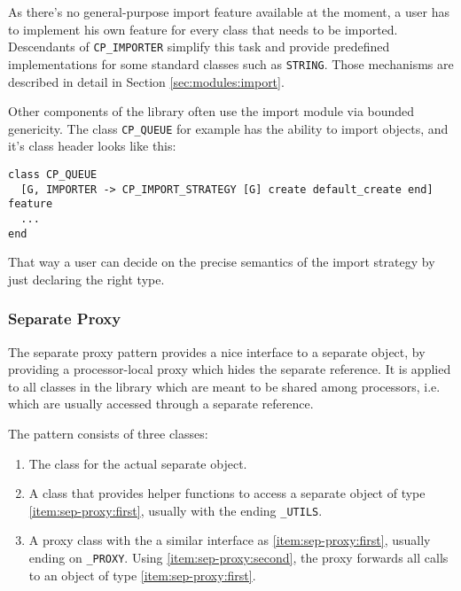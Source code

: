 \documentclass[a4paper,10pt]{article}
\begin{document}
As there's no general-purpose import feature available at the moment, a user has to implement his own feature for every class that needs to be imported.
Descendants of \lstinline!CP_IMPORTER! simplify this task and provide predefined implementations for some standard classes such as \lstinline!STRING!.
Those mechanisms are described in detail in Section \ref{sec:modules:import}.

Other components of the library often use the import module via bounded genericity.
The class \lstinline!CP_QUEUE! for example has the ability to import objects, and it's class header looks like this:
\begin{lstlisting}
class CP_QUEUE
  [G, IMPORTER -> CP_IMPORT_STRATEGY [G] create default_create end]
feature
  ...
end
\end{lstlisting}
That way a user can decide on the precise semantics of the import strategy by just declaring the right type.



\subsubsection{Separate Proxy}

The separate proxy pattern provides a nice interface to a separate object, by providing a processor-local proxy which hides the separate reference.
It is applied to all classes in the library which are meant to be shared among processors, i.e. which are usually accessed through a separate reference.

The pattern consists of three classes:
\begin{enumerate} [label=(\arabic*)]
 \item\label{item:sep-proxy:first} The class for the actual separate object.
 \item\label{item:sep-proxy:second} A class that provides helper functions to access a separate object of type \ref{item:sep-proxy:first}, usually with the ending \lstinline!_UTILS!.
 \item\label{item:sep-proxy:third} A proxy class with the a similar interface as \ref{item:sep-proxy:first}, usually ending on \lstinline!_PROXY!.
    Using \ref{item:sep-proxy:second}, the proxy forwards all calls to an object of type \ref{item:sep-proxy:first}.
\end{enumerate}

\end{document}
